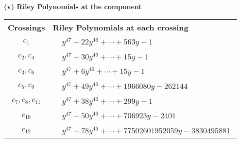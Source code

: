 \documentclass[1p]{elsarticle_modified}
\theoremstyle{definition}
\begin{document}
\newpage\renewcommand{\arraystretch}{1}
\flushleft \textbf{(v) Riley Polynomials at the component}\newline \\
\begin{tabular}{m{50pt}|m{274pt}}
Crossings & \hspace{64pt}Riley Polynomials at each crossing \\
\hline $$\begin{aligned}c_{1}\end{aligned}$$&$\begin{aligned}
&y^{47}-22 y^{46}+\cdots+563 y-1
\end{aligned}$\\
\hline $$\begin{aligned}c_{2},c_{4}\end{aligned}$$&$\begin{aligned}
&y^{47}-30 y^{46}+\cdots+15 y-1
\end{aligned}$\\
\hline $$\begin{aligned}c_{3},c_{6}\end{aligned}$$&$\begin{aligned}
&y^{47}+6 y^{46}+\cdots+15 y-1
\end{aligned}$\\
\hline $$\begin{aligned}c_{5},c_{9}\end{aligned}$$&$\begin{aligned}
&y^{47}+49 y^{46}+\cdots+1966080 y-262144
\end{aligned}$\\
\hline $$\begin{aligned}c_{7},c_{8},c_{11}\end{aligned}$$&$\begin{aligned}
&y^{47}+38 y^{46}+\cdots+299 y-1
\end{aligned}$\\
\hline $$\begin{aligned}c_{10}\end{aligned}$$&$\begin{aligned}
&y^{47}-50 y^{46}+\cdots+706923 y-2401
\end{aligned}$\\
\hline $$\begin{aligned}c_{12}\end{aligned}$$&$\begin{aligned}
&y^{47}-78 y^{46}+\cdots+77502601952059 y-3830495881
\end{aligned}$\\
\hline
\end{tabular}\\~\\
\end{document}
